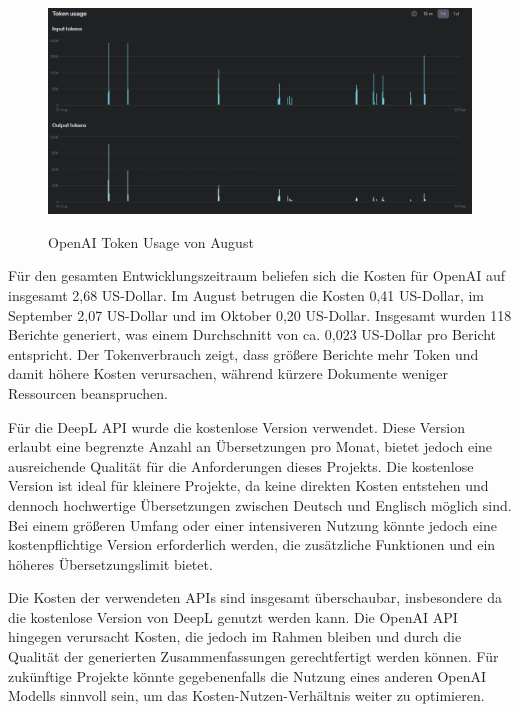 \begin{figure}[H]
\centering
\includegraphics[width=1\linewidth]{Images/TokenUsage.png}\\
\caption{OpenAI Token Usage von August}
\label{fig:OpenAI Token Usage}
\end{figure}

Für den gesamten Entwicklungszeitraum beliefen sich die Kosten für OpenAI auf insgesamt 2,68 US-Dollar. Im August betrugen die Kosten 0,41 US-Dollar, im September 2,07 US-Dollar und im Oktober 0,20 US-Dollar. Insgesamt wurden 118 Berichte generiert, was einem Durchschnitt von ca. 0,023 US-Dollar pro Bericht entspricht. Der Tokenverbrauch zeigt, dass größere Berichte mehr Token und damit höhere Kosten verursachen, während kürzere Dokumente weniger Ressourcen beanspruchen.

Für die DeepL \ac{API} wurde die kostenlose Version verwendet. Diese Version erlaubt eine begrenzte Anzahl an Übersetzungen pro Monat, bietet jedoch eine ausreichende Qualität für die Anforderungen dieses Projekts. Die kostenlose Version ist ideal für kleinere Projekte, da keine direkten Kosten entstehen und dennoch hochwertige Übersetzungen zwischen Deutsch und Englisch möglich sind. Bei einem größeren Umfang oder einer intensiveren Nutzung könnte jedoch eine kostenpflichtige Version erforderlich werden, die zusätzliche Funktionen und ein höheres Übersetzungslimit bietet.

Die Kosten der verwendeten \ac{API}s sind insgesamt überschaubar, insbesondere da die kostenlose Version von DeepL genutzt werden kann. Die OpenAI \ac{API} hingegen verursacht Kosten, die jedoch im Rahmen bleiben und durch die Qualität der generierten Zusammenfassungen gerechtfertigt werden können. Für zukünftige Projekte könnte gegebenenfalls die Nutzung eines anderen OpenAI Modells sinnvoll sein, um das Kosten-Nutzen-Verhältnis weiter zu optimieren.

